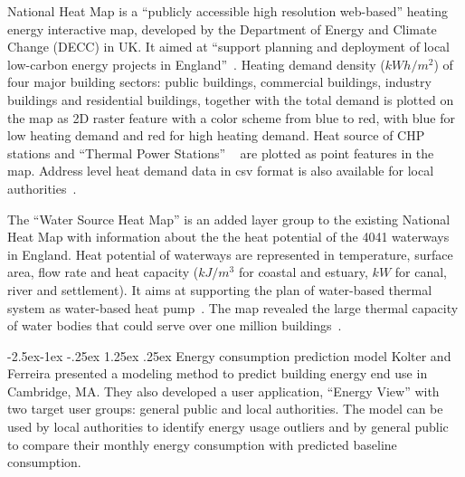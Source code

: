 \documentclass[hidelinks,12pt]{article}
\makeatletter
\renewcommand\paragraph{\@startsection{paragraph}{4}{\z@}%
            {-2.5ex\@plus -1ex \@minus -.25ex}%
            {1.25ex \@plus .25ex}%
            {\normalfont\normalsize\bfseries}}
\makeatother
\begin{document}
National Heat Map is a ``publicly accessible high resolution
web-based'' heating energy interactive map, developed by the
Department of Energy and Climate Change (DECC) in UK. It aimed at
``support planning and deployment of local low-carbon energy projects
in England''~\cite{heatMap2015}. Heating demand density ($kWh/m^2$) of
four major building sectors: public buildings, commercial buildings,
industry buildings and residential buildings, together with the total
demand is plotted on the map as 2D raster feature with a color scheme
from blue to red, with blue for low heating demand and red for high
heating demand. Heat source of CHP stations and ``Thermal Power
Stations'' ~\cite{heatMap2012} are plotted as point features in the
map. Address level heat demand data in csv format is also available
for local authorities~\cite{heatMapLocal2012}. 

The ``Water Source Heat Map'' is an added layer group to the existing
National Heat Map with information about the the heat potential of the
4041 waterways in England. Heat potential of waterways are represented
in temperature, surface area, flow rate and heat capacity ($kJ/m^3$
for coastal and estuary, $kW$ for canal, river and settlement). It
aims at supporting the plan of water-based thermal system as
water-based heat pump~\cite{waterHeatMap}. The map revealed the large
thermal capacity of water bodies that could serve over one million
buildings~\cite{waterHeatMap}.

\paragraph{Energy consumption prediction model}
Kolter and Ferreira presented a modeling method to predict building
energy end use in Cambridge, MA. They also developed a user
application, ``Energy View'' with two target user groups: general
public and local authorities. The model can be used by local
authorities to identify energy usage outliers and by general public to
compare their monthly energy consumption with predicted baseline
consumption.
\end{document}
